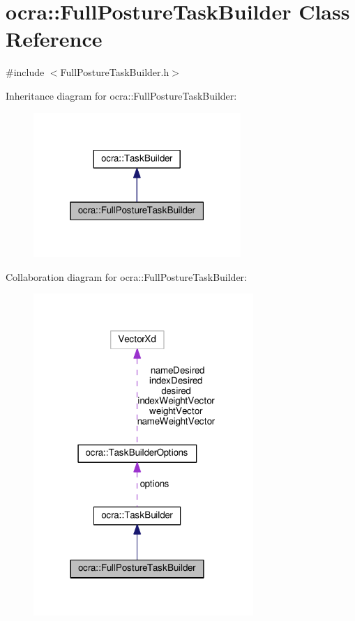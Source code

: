 \hypertarget{classocra_1_1FullPostureTaskBuilder}{}\section{ocra\+:\+:Full\+Posture\+Task\+Builder Class Reference}
\label{classocra_1_1FullPostureTaskBuilder}


{\ttfamily \#include $<$Full\+Posture\+Task\+Builder.\+h$>$}



Inheritance diagram for ocra\+:\+:Full\+Posture\+Task\+Builder\+:
\nopagebreak
\begin{figure}[H]
\begin{center}
\leavevmode
\includegraphics[width=223pt]{d1/d16/classocra_1_1FullPostureTaskBuilder__inherit__graph}
\end{center}
\end{figure}


Collaboration diagram for ocra\+:\+:Full\+Posture\+Task\+Builder\+:
\nopagebreak
\begin{figure}[H]
\begin{center}
\leavevmode
\includegraphics[width=236pt]{d6/d2e/classocra_1_1FullPostureTaskBuilder__coll__graph}
\end{center}
\end{figure}
